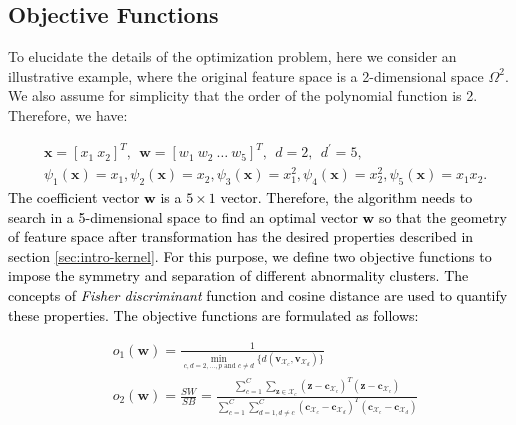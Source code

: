 \subsection{Objective Functions}

To elucidate the details of the optimization problem, here we consider an illustrative example, where the original feature space is a 2-dimensional space $\Omega^2$. %
We also assume for simplicity that the order of the polynomial function is 2. Therefore, we have:

\begin{align}
\nonumber
&\mathbf{x}=[x_1~ x_2]^T,~~ \mathbf{w}=[w_1~ w_2~ \dots~ w_5]^T,~~d=2, ~~d^\prime=5,\\
&\psi_1(\mathbf{x})=x_1, \psi_2(\mathbf{x})=x_2, \psi_3(\mathbf{x})=x_1^2, \psi_4(\mathbf{x})=x_2^2, \psi_5(\mathbf{x})=x_1x_2.
\label{eq5}
\end{align}
\textcolor{black}{The coefficient vector $\mathbf{w}$ is a $5 \times 1$ vector. Therefore, the algorithm needs to search in a 5-dimensional space to find an optimal vector $\mathbf{w}$ so that the geometry of feature space after transformation has the desired properties described in section \ref{sec:intro-kernel}. For this purpose, we define two objective functions to impose the symmetry and separation of different abnormality clusters. The concepts of \textit{Fisher discriminant} function and cosine distance are used to quantify these properties. The objective functions are formulated as follows:}


\begin{align}
\label{eq:obj}
&o_1(\mathbf{w}) = \frac{1}{\underset{c,d=2,\dots,p \text{ and } c\neq d }{\min}\{d(\mathbf{v}_{\mathcal{X}_c},\mathbf{v}_{\mathcal{X}_d})\}} \\ %
\nonumber 
&o_2(\mathbf{w}) = \frac{SW}{SB}=\frac{\sum_{c=1}^{C}  \sum_{\mathbf{z} \in \mathcal{X}_c}   (\mathbf{z}-\mathbf{c}_{\mathcal{X}_c})^T(\mathbf{z}-\mathbf{c}_{\mathcal{X}_c})}{\sum_{c=1}^{C}\sum_{d=1, d\neq c}^{C}  (\mathbf{c}_{\mathcal{X}_c}-\mathbf{c}_{\mathcal{X}_d})^T(\mathbf{c}_{\mathcal{X}_c}-\mathbf{c}_{\mathcal{X}_d}) }
\end{align}

